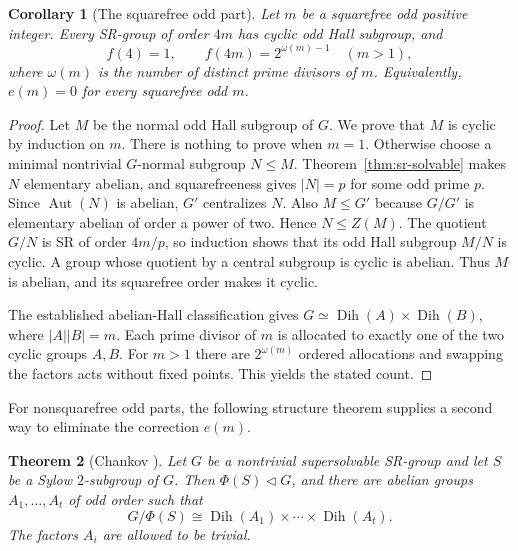 \documentclass[11pt,a4paper]{amsart}
\newtheorem{thm}{Theorem}[section]
\newtheorem{corl}[thm]{Corollary}
\theoremstyle{definition}
\theoremstyle{remark}
\numberwithin{equation}{section}
\begin{document}
\begin{corl}[The squarefree odd part]\label{prop:four-squarefree}
Let $m$ be a squarefree odd positive integer. Every SR-group of
order $4m$ has cyclic odd Hall subgroup, and
\[
 f(4)=1,\qquad f(4m)=2^{\omega(m)-1}\quad(m>1),
\]
where $\omega(m)$ is the number of distinct prime divisors of $m$.
Equivalently, $e(m)=0$ for every squarefree odd $m$.
\end{corl}
\begin{proof}
Let $M$ be the normal odd Hall subgroup of $G$. We prove that
$M$ is cyclic by induction on $m$. There is nothing to prove when
$m=1$. Otherwise choose a minimal nontrivial $G$-normal subgroup
$N\le M$. Theorem~\ref{thm:sr-solvable} makes $N$ elementary abelian, and
squarefreeness gives $|N|=p$ for some odd prime $p$.
Since $\operatorname{Aut}(N)$ is abelian, $G'$ centralizes $N$.
Also $M\le G'$ because $G/G'$ is elementary abelian of order a
power of two. Hence $N\le Z(M)$. The quotient $G/N$ is SR of
order $4m/p$, so induction shows that its odd Hall subgroup
$M/N$ is cyclic. A group whose quotient by a central subgroup
is cyclic is abelian. Thus $M$ is abelian, and its squarefree
order makes it cyclic.

The established abelian-Hall classification gives
$G\simeq\operatorname{Dih}(A)\times\operatorname{Dih}(B)$,
where $|A||B|=m$. Each prime divisor of $m$ is allocated to
exactly one of the two cyclic groups $A,B$. For $m>1$ there are
$2^{\omega(m)}$ ordered allocations and swapping the factors
acts without fixed points. This yields the stated count.
\end{proof}

For nonsquarefree odd parts, the following structure theorem supplies a
second way to eliminate the correction $e(m)$.
\begin{thm}[Chankov {\cite[Chapter~XXVI, Theorem~4.4]{BKZ19}}]
\label{thm:chankov-supersolvable}
Let $G$ be a nontrivial supersolvable SR-group and let $S$ be a Sylow
$2$-subgroup of $G$. Then $\Phi(S)\lhd G$, and there are abelian
groups $A_1,\ldots,A_t$ of odd order such that
\[
 G/\Phi(S)\cong
 \operatorname{Dih}(A_1)\times\cdots\times\operatorname{Dih}(A_t).
\]
The factors $A_i$ are allowed to be trivial.
\end{thm}
\end{document}
